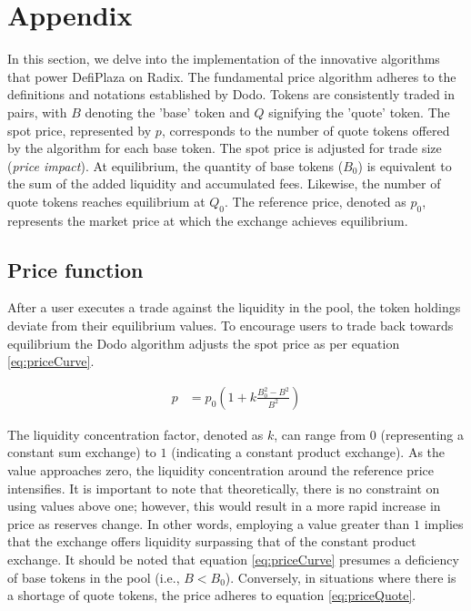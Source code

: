 \section{Appendix}

In this section, we delve into the implementation of the innovative algorithms that power DefiPlaza on Radix. The fundamental price algorithm adheres to the definitions and notations established by Dodo. Tokens are consistently traded in pairs, with $B$ denoting the 'base' token and $Q$ signifying the 'quote' token. The spot price, represented by $p$, corresponds to the number of quote tokens offered by the algorithm for each base token. The spot price is adjusted for trade size (\textit{price impact}). At equilibrium, the quantity of base tokens ($B_0$) is equivalent to the sum of the added liquidity and accumulated fees. Likewise, the number of quote tokens reaches equilibrium at $Q_0$. The reference price, denoted as $p_0$, represents the market price at which the exchange achieves equilibrium.

\subsection{Price function}
After a user executes a trade against the liquidity in the pool, the token holdings deviate from their equilibrium values. To encourage users to trade back towards equilibrium the Dodo algorithm adjusts the spot price as per equation \ref{eq:priceCurve}.

\begin{align} \label{eq:priceCurve}
	p &= p_0 \left( 1 + k \frac{B_0^2 - B^2}{B^2} \right)
\end{align}

The liquidity concentration factor, denoted as $k$, can range from $0$ (representing a constant sum exchange) to $1$ (indicating a constant product exchange). As the value approaches zero, the liquidity concentration around the reference price intensifies. It is important to note that theoretically, there is no constraint on using values above one; however, this would result in a more rapid increase in price as reserves change. In other words, employing a value greater than $1$ implies that the exchange offers liquidity surpassing that of the constant product exchange. It should be noted that equation \ref{eq:priceCurve} presumes a deficiency of base tokens in the pool (i.e., $B < B_0$). Conversely, in situations where there is a shortage of quote tokens, the price adheres to equation \ref{eq:priceQuote}.

